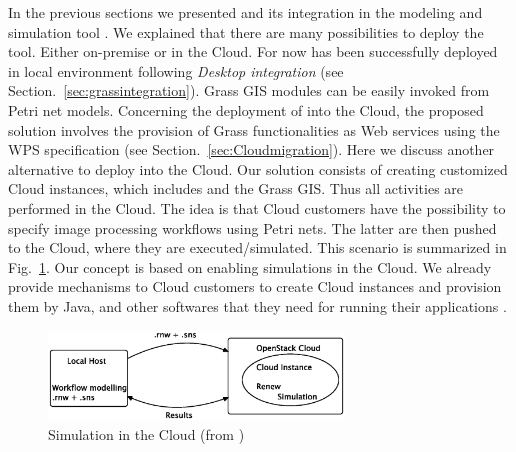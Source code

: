 \label{sec:discussion}
%
In the previous sections we presented \RenewGrass{} and its integration in the modeling and simulation tool \Renew{}. 
%
We explained that there are many possibilities to deploy the tool. 
%
Either on-premise or in the Cloud.
%
For now \RenewGrass{} has been successfully deployed in local environment following \emph{Desktop integration} (see Section.~\ref{sec:grassintegration}). 
%
Grass GIS modules can be easily invoked from Petri net models.
%
Concerning the deployment of \RenewGrass{} into the Cloud, the proposed solution involves the provision of Grass functionalities as Web services using the WPS specification (see Section.~\ref{sec:Cloudmigration}). 
%
Here we discuss another alternative to deploy \RenewGrass{} into the Cloud.
%
Our solution consists of creating customized Cloud instances, which includes \Renew{} and the Grass GIS.
%
Thus all activities are performed in the Cloud.
%
The idea is that Cloud customers have the possibility to specify image processing workflows using Petri nets.
%
The latter are then pushed to the Cloud, where they are executed/simulated.
%
This scenario is summarized in Fig.~\ref{fig:renew_cloud}.
%
Our concept is based on enabling \Renew{} simulations in the Cloud.
%
We already provide mechanisms to Cloud customers to create Cloud instances and provision them by Java, \Renew{} and other softwares that they need for running their applications \cite{Bendoukha+15a}.
%

\begin{figure}[!t]
\centering
\includegraphics[width=0.7\textwidth]{openstacksimulation}
\caption{\Renew{} Simulation in the Cloud (from \cite{Bendoukha+15a})}
\label{fig:renew_cloud}
\end{figure}
%
 

